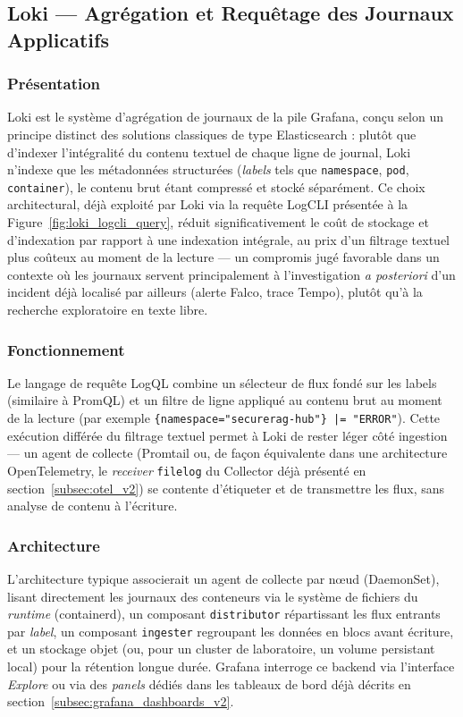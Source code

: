 \subsection{Loki — Agrégation et Requêtage des Journaux Applicatifs}
\label{subsec:loki_v2}

\subsubsection{Présentation}
Loki est le système d'agrégation de journaux de la pile Grafana, conçu selon un principe distinct des solutions classiques de type Elasticsearch : plutôt que d'indexer l'intégralité du contenu textuel de chaque ligne de journal, Loki n'indexe que les métadonnées structurées (\textit{labels} tels que \texttt{namespace}, \texttt{pod}, \texttt{container}), le contenu brut étant compressé et stocké séparément. Ce choix architectural, déjà exploité par Loki via la requête LogCLI présentée à la Figure~\ref{fig:loki_logcli_query}, réduit significativement le coût de stockage et d'indexation par rapport à une indexation intégrale, au prix d'un filtrage textuel plus coûteux au moment de la lecture — un compromis jugé favorable dans un contexte où les journaux servent principalement à l'investigation \textit{a posteriori} d'un incident déjà localisé par ailleurs (alerte Falco, trace Tempo), plutôt qu'à la recherche exploratoire en texte libre.

\subsubsection{Fonctionnement}
Le langage de requête LogQL combine un sélecteur de flux fondé sur les labels (similaire à PromQL) et un filtre de ligne appliqué au contenu brut au moment de la lecture (par exemple \texttt{\{namespace="securerag-hub"\} |= "ERROR"}). Cette exécution différée du filtrage textuel permet à Loki de rester léger côté ingestion — un agent de collecte (Promtail ou, de façon équivalente dans une architecture OpenTelemetry, le \textit{receiver} \texttt{filelog} du Collector déjà présenté en section~\ref{subsec:otel_v2}) se contente d'étiqueter et de transmettre les flux, sans analyse de contenu à l'écriture.

\subsubsection{Architecture}
L'architecture typique associerait un agent de collecte par nœud (DaemonSet), lisant directement les journaux des conteneurs via le système de fichiers du \textit{runtime} (containerd), un composant \texttt{distributor} répartissant les flux entrants par \textit{label}, un composant \texttt{ingester} regroupant les données en blocs avant écriture, et un stockage objet (ou, pour un cluster de laboratoire, un volume persistant local) pour la rétention longue durée. Grafana interroge ce backend via l'interface \textit{Explore} ou via des \textit{panels} dédiés dans les tableaux de bord déjà décrits en section~\ref{subsec:grafana_dashboards_v2}.

